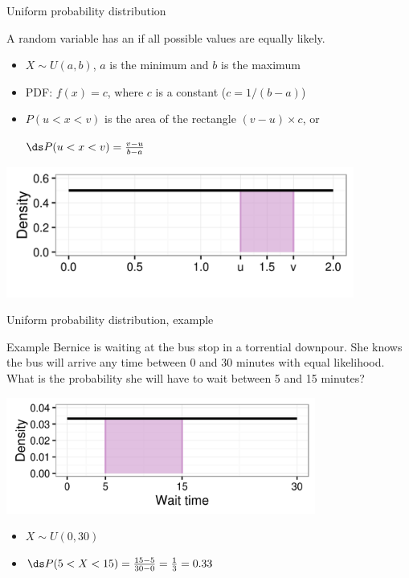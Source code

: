 \documentclass[xcolor=table, handout]{beamer}
\begin{document}
\begin{frame}{Uniform probability distribution}
\begin{block}{}
{\large A random variable has an  if all possible values are equally likely.}
\begin{itemize}
\pause\item $X \sim U(a,b)$, $a$ is the minimum and $b$ is the maximum
\pause\item PDF: $f(x) = c$, where $c$ is a constant ($c = 1/(b-a)$)
\pause\item $P(u < x < v)$ is the area of the rectangle $(v-u) \times c$, or\\
\smallskip
{\centering $\ds P(u < x < v) = \frac {v-u}{b-a}$ \par} 
\end{itemize}
\end{block}
\smallskip
{\centering
\includegraphics[width=4.5in]{../images/ch6_uniform}
\par}

\end{frame}

\begin{frame}{Uniform probability distribution, example}
\begin{exampleblock}{Example}
Bernice is waiting at the bus stop in a torrential downpour. She knows the bus will arrive any time between 0 and 30 minutes with equal likelihood. What is the probability she will have to wait between 5 and 15 minutes?\\
\smallskip
{\centering
\includegraphics[width=4in]{../images/ch6_bus}
\par}
\begin{itemize}
\pause\item $X \sim U(0,30)$
\pause\item $\ds P(5 < X < 15) = \frac{15-5}{30-0} = \frac 1 3 = 0.33$
\end{itemize}
\end{exampleblock}
\end{frame}
\end{document}
